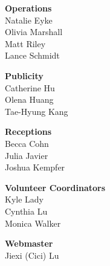 \documentclass[twoside]{article}
\begin{document}
\begin{multicols}{2}
\begin{minipage}{\columnwidth}
\end{minipage}
    \begin{minipage}{\columnwidth}
    {\bf Operations}\\
    Natalie Eyke\\
    Olivia Marshall\\
    Matt Riley\\
    Lance Schmidt\\
    
\end{minipage}
    \begin{minipage}{\columnwidth}
    {\bf Publicity}\\
    Catherine Hu\\
    Olena Huang\\
    Tae-Hyung Kang\\
    
\end{minipage}
    \begin{minipage}{\columnwidth}
    {\bf Receptions}\\
    Becca Cohn\\
    Julia Javier\\
    Joshua Kempfer\\
    
\end{minipage}
    \begin{minipage}{\columnwidth}
    {\bf Volunteer Coordinators}\\
    Kyle Lady\\
    Cynthia Lu\\
    Monica Walker\\
    
\end{minipage}
    \begin{minipage}{\columnwidth}
    {\bf Webmaster}\\
    Jiexi (Cici) Lu\\
    

\end{minipage}
\end{multicols}
\end{document}

